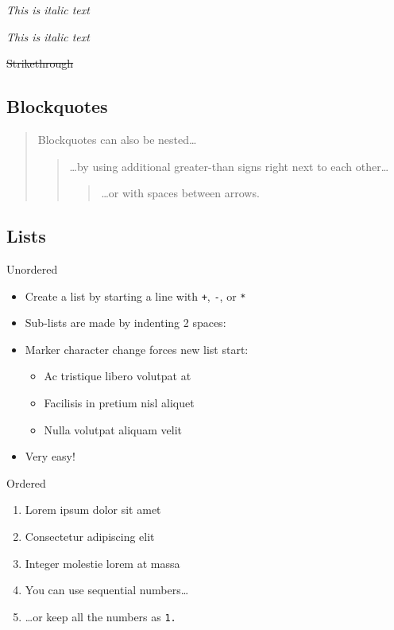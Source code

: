 \documentclass[]{article}
\providecommand{\tightlist}{%
  \setlength{\itemsep}{0pt}\setlength{\parskip}{0pt}}
\begin{document}
\emph{This is italic text}

\emph{This is italic text}

\sout{Strikethrough}

\subsection{Blockquotes}\label{blockquotes}

\begin{quote}
Blockquotes can also be nested\ldots{}

\begin{quote}
\ldots{}by using additional greater-than signs right next to each
other\ldots{}

\begin{quote}
\ldots{}or with spaces between arrows.
\end{quote}
\end{quote}
\end{quote}

\subsection{Lists}\label{lists}

Unordered

\begin{itemize}
\tightlist
\item
  Create a list by starting a line with \texttt{+}, \texttt{-}, or
  \texttt{*}
\item
  Sub-lists are made by indenting 2 spaces:
\item
  Marker character change forces new list start:

  \begin{itemize}
  \tightlist
  \item
    Ac tristique libero volutpat at
  \item
    Facilisis in pretium nisl aliquet
  \item
    Nulla volutpat aliquam velit
  \end{itemize}
\item
  Very easy!
\end{itemize}

Ordered

\begin{enumerate}
\item
  Lorem ipsum dolor sit amet
\item
  Consectetur adipiscing elit
\item
  Integer molestie lorem at massa
\item
  You can use sequential numbers\ldots{}
\item
  \ldots{}or keep all the numbers as \texttt{1.}
\end{enumerate}
\end{document}
